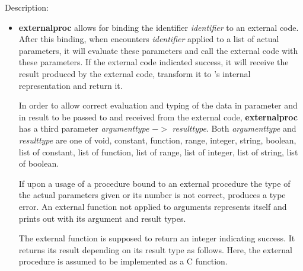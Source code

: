 \noindent Description: \begin{itemize}

\item \textbf{externalproc} allows for binding the \sollya identifier
   \emph{identifier} to an external code.  After this binding, when \sollya
   encounters \emph{identifier} applied to a list of actual parameters, it
   will evaluate these parameters and call the external code with these
   parameters. If the external code indicated success, it will receive
   the result produced by the external code, transform it to \sollya's
   internal representation and return it.
    
   In order to allow correct evaluation and typing of the data in
   parameter and in result to be passed to and received from the external
   code, \textbf{externalproc} has a third parameter \emph{argumenttype} $->$ \emph{resulttype}.
   Both \emph{argumenttype} and \emph{resulttype} are one of void, constant,
   function, range, integer, string, boolean, list of constant, list of
   function, list of range, list of integer, list of string, list of
   boolean.
    
   If upon a usage of a procedure bound to an external procedure the type
   of the actual parameters given or its number is not correct, \sollya
   produces a type error. An external function not applied to arguments
   represents itself and prints out with its argument and result types.
    
   The external function is supposed to return an integer indicating
   success.  It returns its result depending on its \sollya result type
   as follows. Here, the external procedure is assumed to be implemented
   as a C function.
    

\end{itemize}
